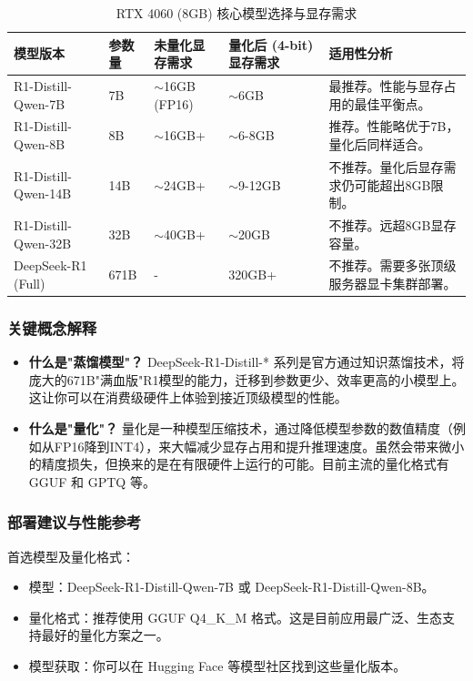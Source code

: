 \documentclass[12pt,UTF8]{ctexbook}
\begin{document}
\begin{table}[htbp]
    \centering
    \caption{RTX 4060 (8GB) 核心模型选择与显存需求}
    \begin{tabular}{|p{2.2cm}|p{1cm}|p{2cm}|p{2.5cm}|p{3cm}|}
        \hline
        \textbf{模型版本} & \textbf{参数量} & \textbf{未量化显存需求} & \textbf{量化后 (4-bit) 显存需求} & \textbf{适用性分析} \\
        \hline
        R1-Distill-Qwen-7B & 7B & $\sim$16GB (FP16) & $\sim$6GB & 最推荐。性能与显存占用的最佳平衡点。 \\
        \hline
        R1-Distill-Qwen-8B & 8B & $\sim$16GB+ & $\sim$6-8GB & 推荐。性能略优于7B，量化后同样适合。 \\
        \hline
        R1-Distill-Qwen-14B & 14B & $\sim$24GB+ & $\sim$9-12GB & 不推荐。量化后显存需求仍可能超出8GB限制。 \\
        \hline
        R1-Distill-Qwen-32B & 32B & $\sim$40GB+ & $\sim$20GB & 不推荐。远超8GB显存容量。 \\
        \hline
        DeepSeek-R1 (Full) & 671B & - & 320GB+ & 不推荐。需要多张顶级服务器显卡集群部署。 \\
        \hline
    \end{tabular}
\end{table}

\subsubsection{关键概念解释}

\begin{itemize}[leftmargin=2cm]
    \item \textbf{什么是"蒸馏模型"？} DeepSeek-R1-Distill-* 系列是官方通过知识蒸馏技术，将庞大的671B"满血版"R1模型的能力，迁移到参数更少、效率更高的小模型上。这让你可以在消费级硬件上体验到接近顶级模型的性能。
    \item \textbf{什么是"量化"？} 量化是一种模型压缩技术，通过降低模型参数的数值精度（例如从FP16降到INT4），来大幅减少显存占用和提升推理速度。虽然会带来微小的精度损失，但换来的是在有限硬件上运行的可能。目前主流的量化格式有 GGUF 和 GPTQ 等。
\end{itemize}

\subsubsection{部署建议与性能参考}

首选模型及量化格式：

\begin{itemize}[leftmargin=2cm]
    \item 模型：DeepSeek-R1-Distill-Qwen-7B 或 DeepSeek-R1-Distill-Qwen-8B。
    \item 量化格式：推荐使用 GGUF Q4\_K\_M 格式。这是目前应用最广泛、生态支持最好的量化方案之一。
    \item 模型获取：你可以在 Hugging Face 等模型社区找到这些量化版本。
\end{itemize}
\end{document}
